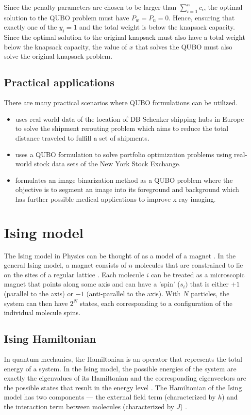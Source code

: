 Since the penalty parameters are chosen to be larger than $\sum_{i=1}^n c_i$, the optimal solution to the QUBO problem must have $P_w = P_n = 0$. Hence, ensuring that exactly one of the $y_i=1$ and the total weight is below the knapsack capacity. Since the optimal solution to the original knapsack must also have a total weight below the knapsack capacity, the value of $x$ that solves the QUBO must also solve the original knapsack problem.

\subsection{Practical applications}
There are many practical scenarios where QUBO formulations can be utilized. 
\begin{itemize}
    \item \cite{b7} uses real-world data of the location of DB Schenker shipping hubs in Europe to solve the shipment rerouting problem which aims to reduce the total distance traveled to fulfill a set of shipments.
    \item \cite{b8} uses a QUBO formulation to solve portfolio optimization problems using real-world stock data sets of the New York Stock Exchange.
    \item \cite{b9} formulates an image binarization method as a QUBO problem where the objective is to segment an image into its foreground and background which has further possible medical applications to improve x-ray imaging.
\end{itemize}

\section{Ising model}
The Ising model in Physics can be thought of as a model of a magnet \cite{b11}. In the general Ising model, a magnet consists of $n$ molecules that are constrained to lie on the sites of a regular lattice \cite{b11}. Each molecule $i$ can be treated as a microscopic magnet that points along some axis and can have a 'spin' ($s_i)$ that is either $+1$ (parallel to the axis) or $-1$ (anti-parallel to the axis). With $N$ particles, the system can then have $2^N$ states, each corresponding to a configuration of the individual molecule spins.

\subsection{Ising Hamiltonian}
In quantum mechanics, the Hamiltonian is an operator that represents the total energy of a system. In the Ising model, the possible energies of the system are exactly the eigenvalues of its Hamiltonian and the corresponding eigenvectors are the possible states that result in the energy level \cite{b21}. The Hamiltonian of the Ising model has two components --- the external field term (characterized by $h$) and the interaction term between molecules (characterized by $J$) \cite{b10}. 

